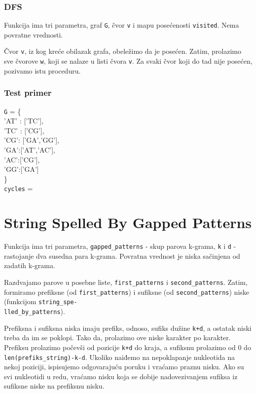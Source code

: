 


\subsubsection{DFS}

Funkcija ima tri parametra, graf \texttt{G}, čvor \texttt{v} i mapu posećenosti \texttt{visited}. Nema povratne vrednosti.

Čvor \texttt{v}, iz kog kreće obilazak grafa, obeležimo da je posećen. Zatim, prolazimo sve čvorove \texttt{w}, koji se nalaze u listi čvora \texttt{v}. Za svaki čvor koji do tad nije posećen, pozivamo istu proceduru.





\subsubsection{Test primer}

\noindent\texttt{G} = \{ \\\indent'AT' : ['TC'],  \\\indent 'TC' : ['CG'], \\\indent'CG': ['GA','GG'],  \\\indent'GA':['AT','AC'],  \\\indent'AC':['CG'], \\\indent'GG':['GA']\\\}
\\\texttt{cycles} =

\section{String Spelled By Gapped Patterns}

Funkcija ima tri parametra, \texttt{gapped\_patterns} - skup parova k-grama, \texttt{k} i \texttt{d} - rastojanje dva susedna para k-grama. Povratna vrednost je niska sačinjena od zadatih k-grama.

Razdvajamo parove u posebne liste, \texttt{first\_patterns} i \texttt{second\_patterns}. Zatim, formiramo prefiksne (od \texttt{first\_patterns}) i sufiksne (od \texttt{second\_patterns}) niske (funkcijom \texttt{string\_spe-\\lled\_by\_patterns}).


Prefiksna i sufiksna niska imaju prefiks, odnoso, sufiks dužine \texttt{k+d}, a ostatak niski treba da im se poklopi. Tako da, prolazimo ove niske karakter po karakter. Prefiksu prolazimo počevši od pozicije \texttt{k+d} do kraja, a sufiksnu prolazimo od 0 do \texttt{len(prefiks\_string)-k-d}. Ukoliko naiđemo na nepoklapanje nukleotida na nekoj poziciji, ispisujemo odgovarajuću poruku i vraćamo praznu nisku. Ako su svi nukleotidi u redu, vraćamo nisku koja se dobije nadovezivanjem sufiksa iz sufiksne niske na prefiksnu nisku.



